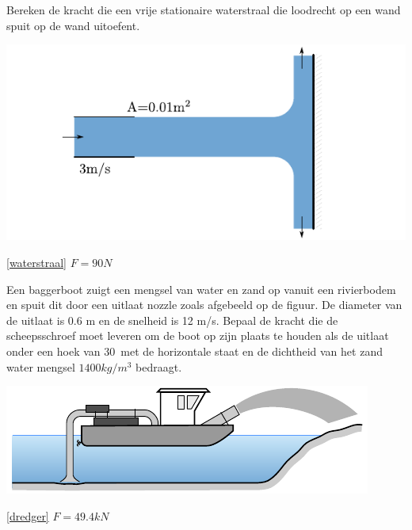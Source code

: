 \begin{toepassing}[*]
	\label{waterstraal}
Bereken de kracht die een vrije stationaire waterstraal die loodrecht op een wand spuit op de wand uitoefent.

	\centering
	\includegraphics{fig/behoudsvergelijkingen/waterstraal}
\end{toepassing}
\begin{antwoord}{\ref{waterstraal}}
	$F = 90 \unit{N}$
\end{antwoord}
\begin{toepassing}
	\label{dredger}
Een baggerboot zuigt een mengsel van water en zand op vanuit een rivierbodem en spuit dit door een uitlaat nozzle zoals afgebeeld op de figuur. De diameter van de uitlaat is 0.6 m en de snelheid is 12 m/s. Bepaal de kracht die de scheepsschroef moet leveren om de boot op zijn plaats te houden als de uitlaat onder een hoek van 30\deg\ met de horizontale staat en de dichtheid van het zand water mengsel $1400 \unit{kg/m^3}$ bedraagt.

	\centering
	\includegraphics{fig/behoudsvergelijkingen/dredger}
\end{toepassing}
\begin{antwoord}{\ref{dredger}}
	$F = 49.4 \unit{kN}$
\end{antwoord}
